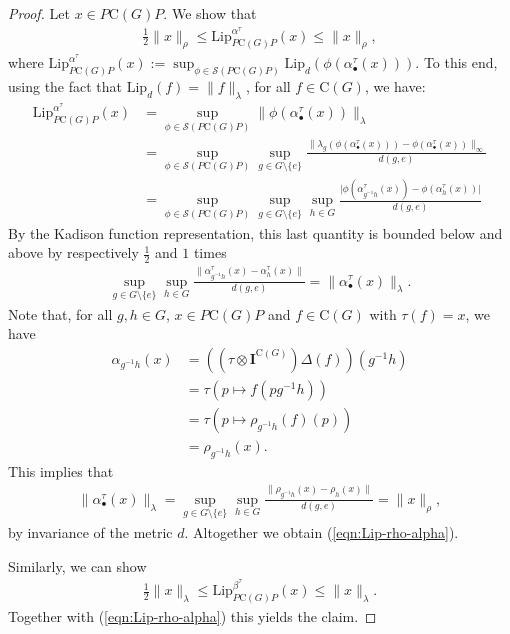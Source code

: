 \documentclass[10pt,a4paper]{amsart}
\begin{document}
	\begin{proof}
		Let $x \in P\mathrm{C}(G)P$.
		We show that
		\begin{align}\label{eqn:Lip-rho-alpha}
			\frac{1}{2} \lVert x \rVert_\rho 
			\leq \mathrm{Lip}^{\alpha^\tau}_{P\mathrm{C}(G)P}(x)
			\leq \lVert x \rVert_\rho,
		\end{align}
		where $\mathrm{Lip}^{\alpha^\tau}_{P\mathrm{C}(G)P}(x) := \sup_{\phi \in \mathcal{S}(P\mathrm{C}(G)P)} \mathrm{Lip}_d (\phi(\alpha^\tau_\bullet(x)))$.
		To this end, using the fact that $\mathrm{Lip}_d(f) = \lVert f \rVert_\lambda$, for all $f \in \mathrm{C}(G)$, we have:
		\begin{align}
			\mathrm{Lip}^{\alpha^\tau}_{P\mathrm{C}(G)P}(x)
			&= \sup_{\phi \in \mathcal{S}(P\mathrm{C}(G)P)} \lVert \phi(\alpha^\tau_\bullet(x)) \rVert_\lambda \\
			&= \sup_{\phi \in \mathcal{S}(P\mathrm{C}(G)P)} \sup_{g \in G \setminus \{e\}} \frac{\lVert \lambda_g(\phi(\alpha^\tau_\bullet(x))) - \phi(\alpha^\tau_\bullet(x)) \rVert_\infty}{d(g,e)} \\
			&= \sup_{\phi \in \mathcal{S}(P\mathrm{C}(G)P)} \sup_{g \in G \setminus \{e\}} \sup_{h \in G} \frac{\lvert \phi(\alpha^\tau_{g^{-1}h}(x)) - \phi(\alpha^\tau_h(x)) \rvert}{d(g,e)}
		\end{align}
		By the Kadison function representation, this last quantity is bounded below and above by respectively $\frac{1}{2}$ and $1$ times 
		\begin{align}
			\sup_{g \in G \setminus \{e\}} \sup_{h \in G} \frac{\lVert \alpha^\tau_{g^{-1}h}(x) - \alpha^\tau_h(x)\rVert}{d(g,e)}
			= \lVert \alpha^\tau_\bullet(x) \rVert_\lambda.
		\end{align}
		Note that, for all $g, h \in G$, $x \in P\mathrm{C}(G)P$ and $f \in \mathrm{C}(G)$ with $\tau(f) = x$, we have
		\begin{align}
			\alpha_{g^{-1}h}(x)
			&= ((\tau \otimes \mathbf{I}^{\mathrm{C}(G)})\Delta(f))(g^{-1}h) \\
			&= \tau(p \mapsto f(pg^{-1}h)) \\
			&= \tau(p \mapsto \rho_{g^{-1}h}(f)(p)) \\
			&= \rho_{g^{-1}h}(x).
		\end{align}
		This implies that 
		\begin{align}
			\lVert \alpha^\tau_\bullet(x) \rVert_\lambda
			= \sup_{g \in G \setminus \{e\}} \sup_{h \in G} \frac{\lVert \rho_{g^{-1}h}(x) - \rho_h(x)\rVert}{d(g,e)}
			= \|x\|_\rho,
		\end{align}
		by invariance of the metric $d$.
		Altogether we obtain (\ref{eqn:Lip-rho-alpha}).
		
		Similarly, we can show 
		\begin{align}
			\frac{1}{2} \lVert x \rVert_\lambda 
			\leq \mathrm{Lip}^{\beta^\tau}_{P\mathrm{C}(G)P}(x)
			\leq \lVert x \rVert_\lambda.
		\end{align}
		Together with (\ref{eqn:Lip-rho-alpha}) this yields the claim.
	\end{proof}
\end{document}
